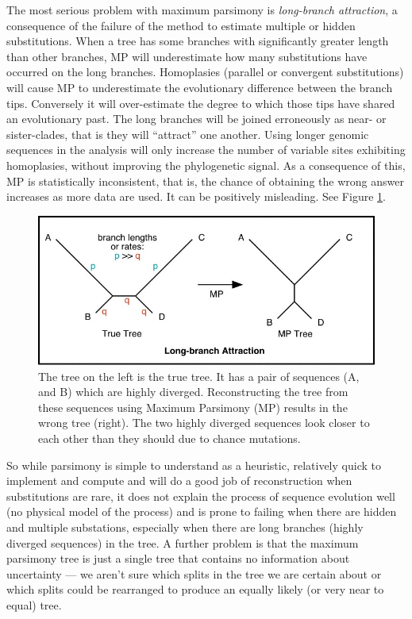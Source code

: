 \documentclass[11pt]{article}
\begin{document}
 The most serious problem with maximum parsimony is {\em long-branch attraction}, a consequence of the failure of the method to estimate multiple or hidden substitutions. When a tree has some branches with significantly greater length than other branches, MP will underestimate how many substitutions have occurred on the long branches. Homoplasies (parallel or convergent substitutions) will cause MP to underestimate the evolutionary difference between the branch tips. Conversely it will over-estimate the degree to which those tips have shared an evolutionary past. The long branches will be joined erroneously as near- or sister-clades, that is they will ``attract'' one another. Using longer genomic sequences in the analysis will only increase the number of variable sites exhibiting homoplasies, without improving the phylogenetic signal. As a consequence of this, MP is statistically inconsistent, that is, the chance of obtaining the wrong answer increases as more data are used.   It can be positively misleading. See Figure \ref{fig:longbranch}.
  
 \begin{figure}[hbtp]
\includegraphics[width=12cm]{figures/longbranch}
\caption{The tree on the left is the true tree. It has a pair of sequences (A, and B) which are highly diverged.  Reconstructing the tree from these sequences using Maximum Parsimony (MP) results in the wrong tree (right).  The two highly diverged sequences look closer to each other than they should due to chance mutations.  }
\label{fig:longbranch}
\end{figure}

  
 So while parsimony is simple to understand as a heuristic, relatively quick to implement and compute and will do a good job of reconstruction when substitutions are rare, it does not explain the process of sequence evolution well (no physical model of the process) and is prone to failing when there are hidden and multiple substations, especially when there are long branches (highly diverged sequences) in the tree.  A further problem is that the maximum parsimony tree is just a single tree that contains no information about uncertainty --- we aren't sure which splits in the tree we are certain about or which splits could be rearranged to produce an equally likely (or very near to equal) tree.
 
\end{document}
